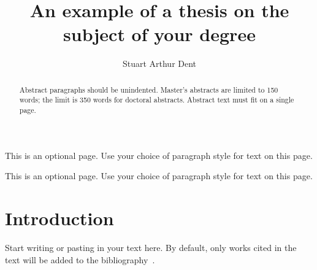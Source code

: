 \documentclass{sfuthesis}
\title{An example of a thesis on the subject of your degree}
\author{Stuart Arthur Dent}
\begin{document}
\frontmatter
\maketitle{}
\makecommittee{}


\begin{abstract}
Abstract paragraphs should be unindented. Master's abstracts are limited to 150 words; the limit is 350 words for doctoral abstracts. Abstract text must fit on a single page. 
\end{abstract}


\begin{dedication}
This is an optional page. Use your choice of paragraph style for text on this page. \end{dedication}


\begin{acknowledgements}
This is an optional page. Use your choice of paragraph style for text on this page. \end{acknowledgements}

%
\tableofcontents%
\clearpage

%
\listoftables
\clearpage

%
\listoffigures
\clearpage





%
%

\mainmatter%

\chapter{Introduction}

Start writing or pasting in your text here. By default, only works cited in the text will be added to the bibliography~\cite{latexcompanion}.



%
%
%
%
%
\end{document}
